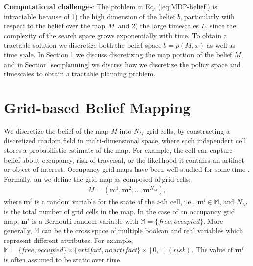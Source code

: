 \documentclass{article}
\newcommand{\ph}[1]{{\textbf{#1}:}} %
\begin{document}
\ph{Computational challenges}
The problem in Eq. (\ref{eq:MDP-belief}) is intractable because of 1) the high dimension of the belief $b$, particularly with respect to the belief over the map $M$, and 2) the large timescales $L$, since the complexity of the search space grows exponentially with time.  To obtain a tractable solution we discretize both the belief space $b=p(M,x)$ as well as time scale.  In Section \ref{sec:lattice_representation} we discuss discretizing the map portion of the belief $M$, and in Section \ref{sec:planning} we discuss how we discretize the policy space and timescales to obtain a tractable planning problem.




\section{Grid-based Belief Mapping} \label{sec:lattice_representation}

We discretize the belief of the map $M$ into $N_M$ grid cells, by constructing a discretized random field in multi-dimensional space, where each independent cell stores a probabilistic estimate of the map.  For example, the cell can capture belief about occupancy, risk of traversal, or the likelihood it contains an artifact or object of interest.  Occupancy grid maps have been well studied for some time \cite{moravec1985high,elfes1990stochastic}.
%
Formally, an we define the grid map as composed of grid cells:
\begin{align}
  M = (\mathbf{m}^1, \mathbf{m}^2, \dots, \mathbf{m}^{N_M}),
\end{align}
where $\mathbf{m}^i$ is a random variable for the state of the $i$-th cell,
i.e., $\mathbf{m}^i \in \mathbb{M}$, and
$N_M$ is the total number of grid cells in the map.
In the case of an occupancy grid map, $\mathbf{m}^i$ is a Bernoulli random variable with $\mathbb{M} = \{free, occupied\}$.  More generally, $\mathbb{M}$ can be the cross space of multiple boolean and real variables which represent different attributes.  For example, $\mathbb{M} = \{free, occupied\}\times\{artifact, no\, artifact\}\times [0,1] (risk)$.
The value of $\mathbf{m}^i$ is often assumed to be static over time.
\end{document}
